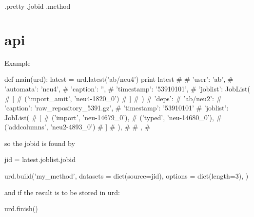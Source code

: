 .pretty
.jobid
.method


\section{api}
Example

\begin{python}
def main(urd):
  latest = urd.latest('ab/neu4')
  print latest
#{
#  'user': 'ab',
#  'automata': 'neu4',
#  'caption': '',
#  'timestamp': '53910101',
#  'joblist': JobList(
#    [
#      ('import_amit', 'neu4-1820_0')
#    ]
#  )
#  'deps': {
#    'ab/neu2': {
#      'caption': 'raw_repository_5391.gz',
#      'timestamp': '53910101'
#      'joblist': JobList(
#        [
#          ('import', 'neu-14679_0'),
#          ('typed', 'neu-14680_0'),
#          ('addcolumns', 'neu2-4893_0')
#        ]
#      ),
#    }
#  },
#}
\end{python}
so the jobid is found by

\begin{python}
  jid = latest.joblist.jobid

  urd.build('my_method',
    datasets = dict(source=jid),
    options = dict(length=3),
  )
\end{python}
and if the result is to be stored in urd:

\begin{python}
  urd.finish()
\end{python}

